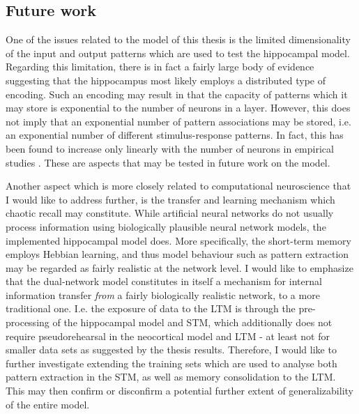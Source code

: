 \subsection*{Future work}


One of the issues related to the model of this thesis is the limited dimensionality of the input and output patterns which are used to test the hippocampal model. Regarding this limitation, there is in fact a fairly large body of evidence suggesting that the hippocampus most likely employs a distributed type of encoding. Such an encoding may result in that the capacity of patterns which it may store is exponential to the number of neurons in a layer.
However, this does not imply that an exponential number of pattern associations may be stored, i.e. an exponential number of different stimulus-response patterns. In fact, this has been found to increase only linearly with the number of neurons in empirical studies \citep{Rolls1998chpt6}. These are aspects that may be tested in future work on the model.

Another aspect which is more closely related to computational neuroscience that I would like to address further, is the transfer and learning mechanism which chaotic recall may constitute.
While artificial neural networks do not usually process information using biologically plausible neural network models, the implemented hippocampal model does. More specifically, the short-term memory employs Hebbian learning, and thus model behaviour such as pattern extraction may be regarded as fairly realistic at the network level.
I would like to emphasize that the dual-network model constitutes in itself a mechanism for internal information transfer \textit{from} a fairly biologically realistic network, to a more traditional one. I.e. the exposure of data to the LTM is through the pre-processing of the hippocampal model and STM, which additionally does not require pseudorehearsal in the neocortical model and LTM - at least not for smaller data sets as suggested by the thesis results. Therefore, I would like to further investigate extending the training sets which are used to analyse both pattern extraction in the STM, as well as memory consolidation to the LTM. This may then confirm or disconfirm a potential further extent of generalizability of the entire model.

